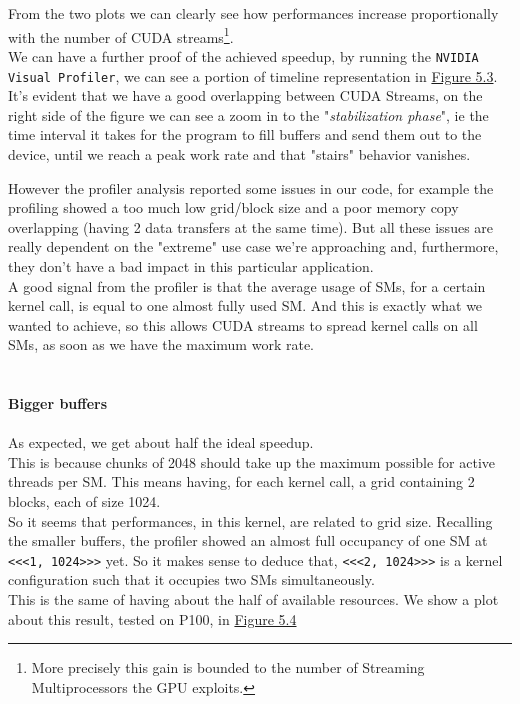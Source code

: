 	From the two plots we can clearly see how performances increase proportionally with the number of CUDA streams\footnote{More precisely this gain is bounded to the number of Streaming Multiprocessors the GPU exploits.}.\\
	We can have a further proof of the achieved speedup, by running the \texttt{NVIDIA Visual Profiler}, we can see a portion of timeline representation in \hyperref[fig:cosprofiling]{Figure 5.3}. It's evident that we have a good overlapping between CUDA Streams, on the right side of the figure we can see a zoom in to the "\textit{stabilization phase}", ie the time interval it takes for the program to fill buffers and send them out to the device, until we reach a peak work rate and that "stairs" behavior vanishes.
	
	However the profiler analysis reported some issues in our code, for example the profiling showed a too much low grid/block size and a poor memory copy overlapping (having 2 data transfers at the same time). But all these issues are really dependent on the "extreme" use case we're approaching and, furthermore, they don't have a bad impact in this particular application.\\
	A good signal from the profiler is that the average usage of SMs, for a certain kernel call, is equal to one almost fully used SM. And this is exactly what we wanted to achieve, so this allows CUDA streams to spread kernel calls on all SMs, as soon as we have the maximum work rate.\\\\\\
	{\large \textbf{Bigger buffers}}\\\\
	As expected, we get about half the ideal speedup.\\
	This is because chunks of 2048 should take up the maximum possible for active threads per SM. This means having, for each kernel call, a grid containing 2 blocks, each of size 1024.\\
	So it seems that performances, in this kernel, are related to grid size. Recalling the smaller buffers, the profiler showed an almost full occupancy of one SM at \texttt{<<<1, 1024>>>} yet. So it makes sense to deduce that, \texttt{<<<2, 1024>>>} is a kernel configuration such that it occupies two SMs simultaneously. \\
	This is the same of having about the half of available resources.
	We show a plot about this result, tested on P100, in \hyperref[fig:biggerbufferspeedup]{Figure 5.4}
	
